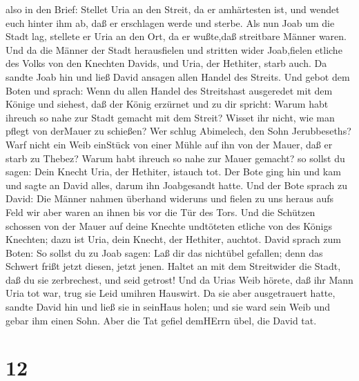 also in den Brief: Stellet Uria an den Streit, da er amhärtesten ist,
und wendet euch hinter ihm ab, daß er erschlagen werde und sterbe.
 Als nun Joab um die Stadt lag, stellete er Uria an den
Ort, da er wußte,daß streitbare Männer waren.  Und da die
Männer der Stadt herausfielen und stritten wider Joab,fielen etliche des
Volks von den Knechten Davids, und Uria, der Hethiter, starb auch.
 Da sandte Joab hin und ließ David ansagen allen Handel des
Streits.  Und gebot dem Boten und sprach: Wenn du allen
Handel des Streitshast ausgeredet mit dem Könige  und
siehest, daß der König erzürnet und zu dir spricht: Warum habt ihreuch
so nahe zur Stadt gemacht mit dem Streit? Wisset ihr nicht, wie man
pflegt von derMauer zu schießen?  Wer schlug Abimelech, den
Sohn Jerubbeseths? Warf nicht ein Weib einStück von einer Mühle auf ihn
von der Mauer, daß er starb zu Thebez? Warum habt ihreuch so nahe zur
Mauer gemacht? so sollst du sagen: Dein Knecht Uria, der Hethiter,
istauch tot.  Der Bote ging hin und kam und sagte an David
alles, darum ihn Joabgesandt hatte.  Und der Bote sprach zu
David: Die Männer nahmen überhand wideruns und fielen zu uns heraus aufs
Feld wir aber waren an ihnen bis vor die Tür des Tors.  Und
die Schützen schossen von der Mauer auf deine Knechte undtöteten etliche
von des Königs Knechten; dazu ist Uria, dein Knecht, der Hethiter,
auchtot.  David sprach zum Boten: So sollst du zu Joab
sagen: Laß dir das nichtübel gefallen; denn das Schwert frißt jetzt
diesen, jetzt jenen. Haltet an mit dem Streitwider die Stadt, daß du sie
zerbrechest, und seid getrost!  Und da Urias Weib hörete,
daß ihr Mann Uria tot war, trug sie Leid umihren Hauswirt. 
Da sie aber ausgetrauert hatte, sandte David hin und ließ sie in
seinHaus holen; und sie ward sein Weib und gebar ihm einen Sohn. Aber
die Tat gefiel demHErrn übel, die David tat.

\hypertarget{section-11}{%
\section{12}\label{section-11}}

